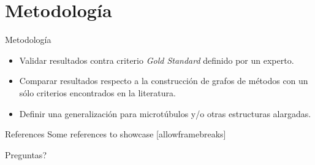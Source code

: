 \documentclass[10pt]{beamer}
\newcommand{\themename}{\textbf{\textsc{metropolis}}\xspace}
\begin{document}
\section{Metodolog\'ia}

\begin{frame}{Metodolog\'ia}
  \begin{itemize}
    \item Validar resultados contra criterio \textit{Gold Standard} definido por un experto.
    \item Comparar resultados respecto a la construcci\'on de grafos de m\'etodos con un s\'olo criterios encontrados en la literatura. 
    \item Definir una generalizaci\'on para microt\'ubulos y/o otras estructuras alargadas.
  \end{itemize}
\end{frame}

\begin{frame}{References}
  Some references to showcase [allowframebreaks] \cite{knuth92,ConcreteMath,Simpson,Er01,greenwade93}
\end{frame}


{
\begin{frame}[standout]
  Preguntas?
\end{frame}
}

\appendix





%  
%  

\end{document}
